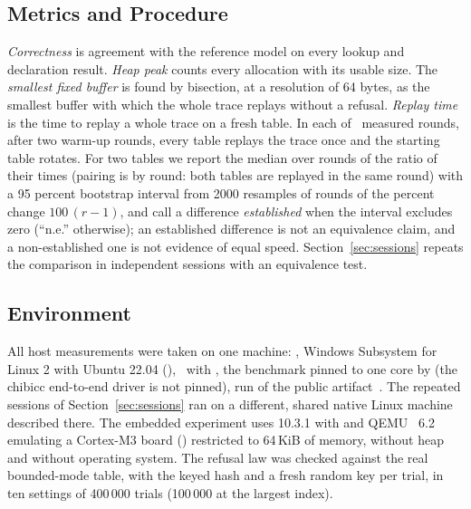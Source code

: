\subsection{Metrics and Procedure}
\emph{Correctness} is agreement with the reference model on every lookup and declaration result. \emph{Heap peak} counts every allocation with its usable size. The \emph{smallest fixed buffer} is found by bisection, at a resolution of 64 bytes, as the smallest buffer with which the whole trace replays without a refusal. \emph{Replay time} is the time to replay a whole trace on a fresh table. In each of \Rounds\ measured rounds, after two warm-up rounds, every table replays the trace once and the starting table rotates. For two tables we report the median over rounds of the ratio of their times (pairing is by round: both tables are replayed in the same round) with a 95 percent bootstrap interval from 2000 resamples of rounds of the percent change $100\,(r-1)$, and call a difference \emph{established} when the interval excludes zero (``n.e.'' otherwise); an established difference is not an equivalence claim, and a non-established one is not evidence of equal speed. Section~\ref{sec:sessions} repeats the comparison in independent sessions with an equivalence test.

\subsection{Environment}
All host measurements were taken on one machine: \EnvCPU, Windows Subsystem for Linux 2 with Ubuntu 22.04 (\EnvKernel), \EnvCompiler\ with , the benchmark pinned to one core by  (the chibicc end-to-end driver is not pinned), run \code{\RunName} of the public artifact~\cite{strata}. The repeated sessions of Section~\ref{sec:sessions} ran on a different, shared native Linux machine described there. The embedded experiment uses  10.3.1 with  and QEMU~\cite{bellard2005qemu} 6.2 emulating a Cortex-M3 board () restricted to 64\,KiB of memory, without heap and without operating system. The refusal law was checked against the real bounded-mode table, with the keyed hash and a fresh random key per trial, in ten settings of 400\,000 trials (100\,000 at the largest index).

